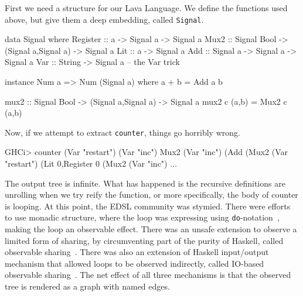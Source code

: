 \documentclass[11pt]{article}
\begin{document}
First we need a structure for our Lava Language. We define the
functions used above, but give them a deep embedding, called \verb|Signal|.
\begin{Code}
        
data Signal where
  Register :: a -> Signal a                      -> Signal a
  Mux2     :: Signal Bool -> (Signal a,Signal a) -> Signal a
  Lit      :: a                                  -> Signal a
  Add      :: Signal a -> Signal a               -> Signal a
  Var      :: String                             -> Signal a -- the Var trick

instance Num a => Num (Signal a) where
  a + b = Add a b

mux2 :: Signal Bool -> (Signal a,Signal a) -> Signal a
mux2 c (a,b) = Mux2 c (a,b)

\end{Code}
Now, if we attempt to extract \verb|counter|, things go horribly wrong.
\begin{Code}
GHCi> counter (Var "restart") (Var "inc")
Mux2 (Var "inc") (Add (Mux2 (Var "restart") (Lit 0,Register 0 (Mux2 (Var "inc") ...
\end{Code}        
The output tree is infinite.
What has happened is the recursive definitions are unrolling when we try reify the function,
or more specifically, the body of counter is looping. At this point, the EDSL community was
stymied. There were efforts to use monadic structure, where the loop was expressing using
\verb|do|-notation~\cite{Erkok:2000:Recursive-Monad},
making the loop an observable effect. There was an unsafe
extension to observe a limited form of sharing, by circumventing part of the purity of Haskell,
called observable sharing~\cite{Claessen:99:ObserveSharing}.
There was also an extension of Haskell input/output mechanism that allowed loops to
be observed indirectly, called IO-based observable sharing~\cite{Gill:09:TypeSafeReification}. 
The net effect of all three
mechanisms is that the observed tree is rendered as a graph with named edges.
\end{document}
